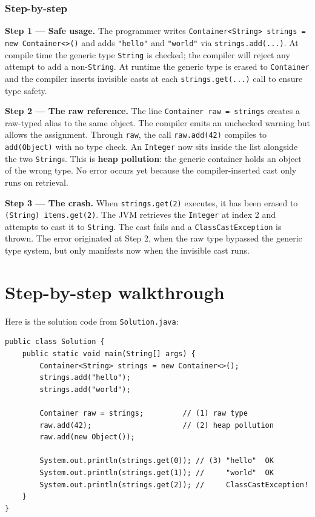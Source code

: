 \documentclass[twoside=false,DIV=14]{scrartcl}
\begin{document}
\subsubsection*{Step-by-step}

\textbf{Step 1 --- Safe usage.}  The programmer writes \texttt{Container<String> strings = new Container<>()} and adds \texttt{"hello"} and \texttt{"world"} via \texttt{strings.add(...)}.  At compile time the generic type \texttt{String} is checked; the compiler will reject any attempt to add a non-\texttt{String}.  At runtime the generic type is erased to \texttt{Container} and the compiler inserts invisible casts at each \texttt{strings.get(...)} call to ensure type safety.

\textbf{Step 2 --- The raw reference.}  The line \texttt{Container raw = strings} creates a raw-typed alias to the same object.  The compiler emits an unchecked warning but allows the assignment.  Through \texttt{raw}, the call \texttt{raw.add(42)} compiles to \texttt{add(Object)} with no type check.  An \texttt{Integer} now sits inside the list alongside the two \texttt{String}s.  This is \textbf{heap pollution}: the generic container holds an object of the wrong type.  No error occurs yet because the compiler-inserted cast only runs on retrieval.

\textbf{Step 3 --- The crash.}  When \texttt{strings.get(2)} executes, it has been erased to \texttt{(String) items.get(2)}.  The JVM retrieves the \texttt{Integer} at index 2 and attempts to cast it to \texttt{String}.  The cast fails and a \texttt{ClassCastException} is thrown.  The error originated at Step 2, when the raw type bypassed the generic type system, but only manifests now when the invisible cast runs.

\section*{Step-by-step walkthrough}

Here is the solution code from \texttt{Solution.java}:

\begin{lstlisting}
public class Solution {
    public static void main(String[] args) {
        Container<String> strings = new Container<>();
        strings.add("hello");
        strings.add("world");

        Container raw = strings;         // (1) raw type
        raw.add(42);                     // (2) heap pollution
        raw.add(new Object());

        System.out.println(strings.get(0)); // (3) "hello"  OK
        System.out.println(strings.get(1)); //     "world"  OK
        System.out.println(strings.get(2)); //     ClassCastException!
    }
}
\end{lstlisting}
\end{document}
